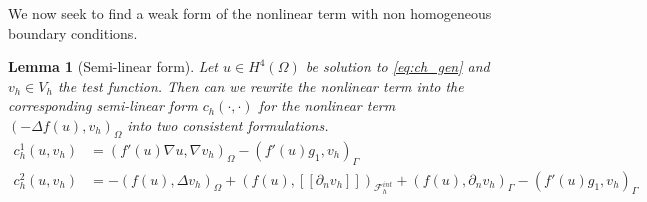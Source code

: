 \documentclass[11pt]{article}
\newtheorem{lemma}[theorem]{Lemma}
\theoremstyle{remark}
\newtheorem*{remark}{Remark}
\newcommand{\jump}[1]{\left[\!\left[ #1 \right]\!\right]}
\numberwithin{equation}{section}
\begin{document}
We now seek to find a weak form of the nonlinear term with non homogeneous boundary conditions.
\begin{lemma}[Semi-linear form]
    Let $u \in H^4( \Omega ) $ be solution to \eqref{eq:ch_gen} and $v_{h} \in V_{h}$ the test function.
Then can we rewrite the nonlinear term into the corresponding semi-linear form $c_{h}( \cdot ,\cdot )  $ for the nonlinear term $( -\Delta f( u) , v_{h})_{\Omega }$ into two consistent formulations.
\begin{align}
    \label{eq:ch:1}
      c^{1}_{h} ( u,v_{h})  & = ( f' ( u) \nabla u, \nabla v_{h} )_{\Omega }  - ( f'( u)  g_{1}   ,  v_{h})_{\Gamma } \\
    \label{eq:ch:2}
        c^{2}_{h} ( u,v_{h})  & = -( f( u), \Delta v_{h} )_{\Omega }+  ( f( u) , \jump{ \partial _{n}v_{h} }  )_{\mathcal{F} _{h}^{int}} + ( f(u), \partial _{n} v_{h})_{\Gamma  }  - ( f'( u)  g_{1}   ,  v_{h})_{\Gamma }
\end{align}

\end{lemma}
\end{document}
